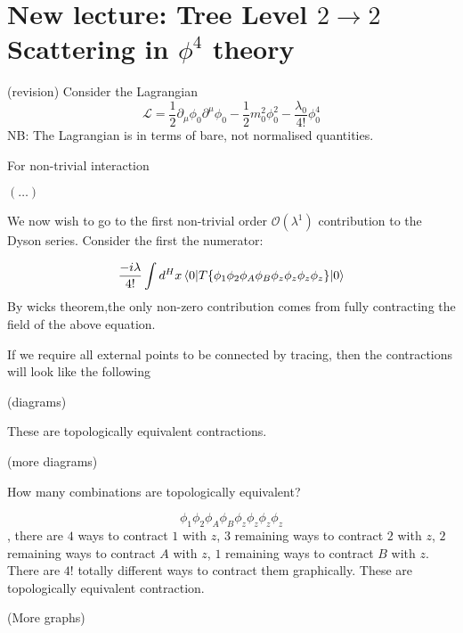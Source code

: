 \section{New lecture: Tree Level $2\to 2$ Scattering in $\phi^4$ theory}

(revision)
Consider the Lagrangian
\begin{equation}
    \mathcal{L} = \frac{1}{2} \partial_\mu \phi_0 \partial^\mu \phi_0 - \frac{1}{2} m_{0}^{2} \phi_{0}^{2} - \frac{\lambda_0}{4!} \phi_{0}^{4}
\end{equation}
NB: The Lagrangian is in terms of bare, not normalised quantities. 

For non-trivial interaction 



$(\dots)$

We now wish to go to the first non-trivial order $\mathcal{O}(\lambda^1)$ contribution to the Dyson series. Consider the first the numerator:

\begin{align}
\frac{-i\lambda}{4!} \int d^H x \mel{0}{ T\{  \phi_1 \phi_2 \phi_A \phi_B \phi_z\phi_z\phi_z\phi_z \} }{0}
\end{align}
By wicks theorem,the only non-zero contribution comes from fully contracting the field of the above equation.

If we require all external points to be connected by tracing, then the contractions will look like the following

(diagrams)

These are topologically equivalent contractions. 


(more diagrams)

How many combinations are topologically equivalent?

$$\phi_1  \phi_2 \phi_A \phi_B \phi_z \phi_z \phi_z \phi_z$$, there are $4$ ways to contract $1$ with $z$, $3$ remaining ways to contract $2$ with $z$, $2$ remaining ways to contract $A$ with $z$, $1$ remaining ways to contract $B$ with $z$. There are $4!$ totally different ways to contract them graphically. These are topologically equivalent contraction. 

(More graphs)

